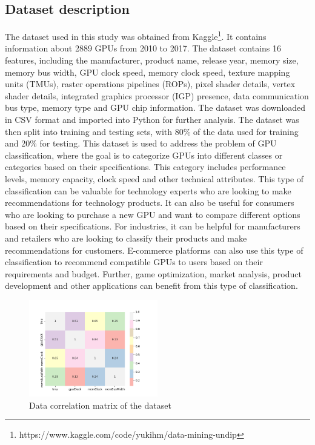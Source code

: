 \documentclass[conference,onecolumn]{IEEEtran}
\begin{document}
\subsection{Dataset description}
    The dataset used in this study was obtained from Kaggle\footnote{https://www.kaggle.com/code/yukihm/data-mining-undip}. It contains information about 2889 GPUs from 2010 to 2017. The dataset contains 16 features, including the manufacturer, product name, release year, memory size, memory bus width, GPU clock speed, memory clock speed, texture mapping units (TMUs), raster operations pipelines (ROPs), pixel shader details, vertex shader details, integrated graphics processor (IGP) presence, data communication bus type, memory type and GPU chip information. The dataset was downloaded in CSV format and imported into Python for further analysis. The dataset was then split into training and testing sets, with 80\% of the data used for training and 20\% for testing. 
    This dataset is used to address the problem of GPU classification, where the goal is to categorize GPUs into different classes or categories based on their specifications. This category includes performance levels, memory capacity, clock speed and other technical attributes. This type of classification can be valuable for technology experts who are looking to make recommendations for technology products. It can also be useful for consumers who are looking to purchase a new GPU and want to compare different options based on their specifications. For industries, it can be helpful for manufacturers and retailers who are looking to classify their products and make recommendations for customers. E-commerce platforms can also use this type of classification to recommend compatible GPUs to users based on their requirements and budget. Further, game optimization, market analysis, product development and other applications can benefit from this type of classification.

    \begin{figure}[H]
		\centering
		\includegraphics[width=0.5\textwidth]{Plots/DataCorelation.png}
		\caption{Data correlation matrix of the dataset}
		\label{fig:datacorrelationmatrix}
	\end{figure}
\end{document}
